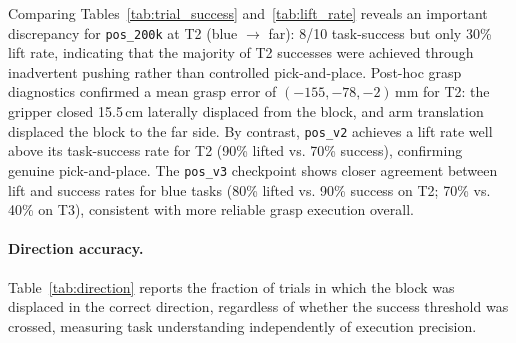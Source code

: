 \documentclass[12pt]{article}
\begin{document}
\begin{table}[H]
\centering
\caption{Block-lifted rate (\% of trials with block\_z $>$ 0.295\,m during the episode). Bold: highest per task.}
\label{tab:lift_rate}
\end{table}

Comparing Tables~\ref{tab:trial_success} and~\ref{tab:lift_rate} reveals an important discrepancy for \texttt{pos\_200k} at T2 (blue $\to$ far): 8/10 task-success but only 30\% lift rate, indicating that the majority of T2 successes were achieved through inadvertent pushing rather than controlled pick-and-place. Post-hoc grasp diagnostics confirmed a mean grasp error of $(-155, -78, -2)$\,mm for T2: the gripper closed 15.5\,cm laterally displaced from the block, and arm translation displaced the block to the far side. By contrast, \texttt{pos\_v2} achieves a lift rate well above its task-success rate for T2 (90\% lifted vs. 70\% success), confirming genuine pick-and-place. The \texttt{pos\_v3} checkpoint shows closer agreement between lift and success rates for blue tasks (80\% lifted vs. 90\% success on T2; 70\% vs. 40\% on T3), consistent with more reliable grasp execution overall.

\paragraph{Direction accuracy.} Table~\ref{tab:direction} reports the fraction of trials in which the block was displaced in the correct direction, regardless of whether the success threshold was crossed, measuring task understanding independently of execution precision.
\end{document}
